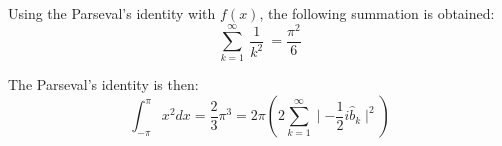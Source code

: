 Using the Parseval's identity with $f(x)$, the following summation is obtained: 
\begin{equation} 
    \sum_{k=1} ^{\infty} \  \frac{1}{k^2}  \  = \frac{\pi^2}{6}
\end{equation}

The Parseval's identity is then:
$$
\int_{-\pi}^{\pi}  x^2 dx  = \frac{2}{3} \pi^3 = 2\pi \left(   2\sum_{k=1}^{\infty}  \mid  -\frac{1}{2} i \hat{b}_k   \mid ^2  \right)
$$
